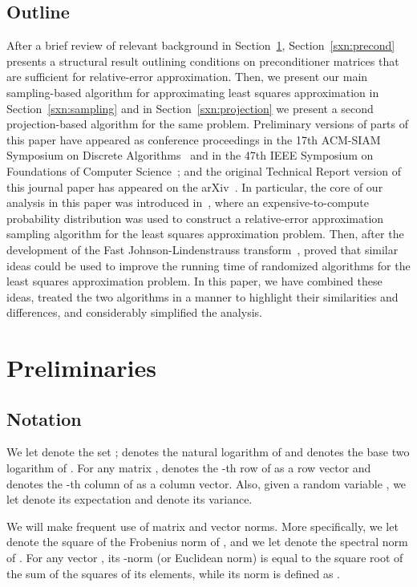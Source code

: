 \documentclass[11pt]{article}
\begin{document}
\subsection{Outline}

After a brief review of relevant background in Section~\ref{sxn:review_la}, Section~\ref{sxn:precond} presents a structural result outlining conditions on preconditioner matrices that are sufficient for relative-error approximation. Then, we present our main sampling-based algorithm for approximating least squares approximation in Section~\ref{sxn:sampling} and in Section~\ref{sxn:projection} we present a second projection-based algorithm for the same problem.
Preliminary versions of parts of this paper have appeared as conference
proceedings in the 17th ACM-SIAM Symposium on Discrete
Algorithms~\cite{DMM06} and in the 47th IEEE Symposium on Foundations of
Computer Science~\cite{Sarlos06}; and the original Technical Report version
of this journal paper has appeared on the arXiv~\cite{DMMS07_FastL2_TR}.
In particular, the core of our analysis in this paper was introduced in~\cite{DMM06}, where an expensive-to-compute probability distribution was used to construct a relative-error approximation sampling algorithm for the least squares approximation problem. Then, after the development of the Fast Johnson-Lindenstrauss transform~\cite{AC06}, \cite{Sarlos06} proved that similar ideas could be used to improve the running time of randomized algorithms for the least squares approximation problem. In this paper, we have combined these ideas, treated the two algorithms in a manner to highlight their similarities and differences, and considerably simplified the analysis.

\section{Preliminaries}
\label{sxn:review_la}

\subsection{Notation}

We let  denote the set ;  denotes the natural logarithm of  and  denotes the base two logarithm of . For any matrix ,  denotes the -th row of  as a row vector and  denotes the -th column of  as a column vector. Also, given a random variable , we let  denote its expectation and  denote its variance.

We will make frequent use of matrix and vector norms. More specifically, we let  denote the square of the Frobenius norm of , and we let  denote the spectral norm of . For any vector , its -norm (or Euclidean norm) is equal to the square root of the sum of the squares of its elements, while its  norm is defined as .
\end{document}
